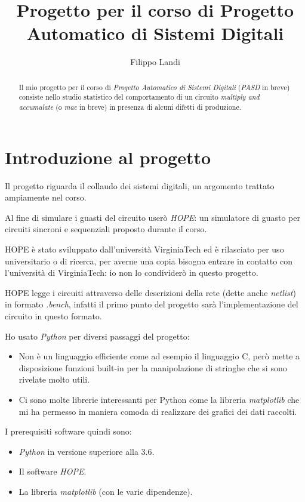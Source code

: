 \documentclass[12pt, letterpaper]{article}
\title{Progetto per il corso di Progetto Automatico di Sistemi Digitali}
\author{Filippo Landi}
\begin{document}
\maketitle

\begin{abstract}
Il mio progetto per il corso di \textit{Progetto Automatico di Sistemi Digitali} (\textit{PASD} in breve) consiste nello studio statistico del comportamento di un circuito \textit{multiply and accumulate} (o \textit{mac} in breve) in presenza di alcuni difetti di produzione.
\end{abstract}

\section{Introduzione al progetto}

Il progetto riguarda il collaudo dei sistemi digitali, un argomento trattato ampiamente nel corso.

Al fine di simulare i guasti del circuito userò \textit{HOPE}: un simulatore di guasto per circuiti sincroni e sequenziali proposto durante il corso.

HOPE è stato sviluppato dall'università VirginiaTech ed è rilasciato per uso universitario o di ricerca, per averne una copia bisogna entrare in contatto con l'università di VirginiaTech: io non lo condividerò in questo progetto.

HOPE legge i circuiti attraverso delle descrizioni della rete (dette anche \textit{netlist}) in formato \textit{.bench}, infatti il primo punto del progetto sarà l'implementazione del circuito in questo formato.

Ho usato \textit{Python} per diversi passaggi del progetto: 
\begin{itemize}
\item Non è un linguaggio efficiente come ad esempio il linguaggio C, però mette a disposizione funzioni built-in per la manipolazione di stringhe che si sono rivelate molto utili.
\item Ci sono molte librerie interessanti per Python come la libreria \textit{matplotlib} che mi ha permesso in maniera comoda di realizzare dei grafici dei dati raccolti.
\end{itemize}

I prerequisiti software quindi sono:
\begin{itemize} 
\item \textit{Python} in versione superiore alla 3.6.
\item Il software \textit{HOPE}.
\item La libreria \textit{matplotlib} (con le varie dipendenze).
\end{itemize}
\end{document}
